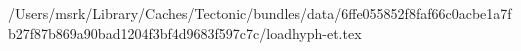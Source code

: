 /Users/msrk/Library/Caches/Tectonic/bundles/data/6ffe055852f8faf66c0acbe1a7fb27f87b869a90bad1204f3bf4d9683f597c7c/loadhyph-et.tex